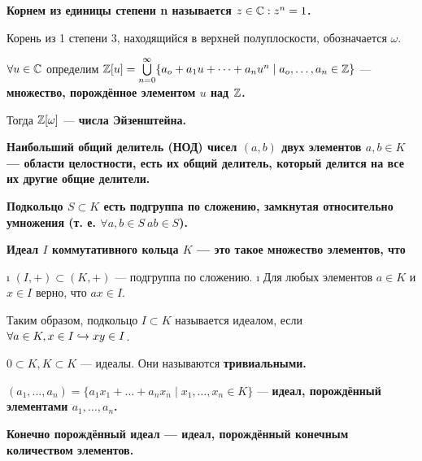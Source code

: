 \begin{defn}
\bf{Корнем из единицы степени n} называется \(z \in \mathbb{C}: z^n=1\).

Корень из 1 степени 3, находящийся в верхней полуплоскости, обозначается \(\omega\).

\(\forall u \in \mathbb{C}\) определим \(\mathbb{Z}[u] = \bigcup\limits_{n=0}^\infty \{a_o+a_1u+\dots+a_nu^n \mid a_o, \dots, a_n \in \mathbb{Z} \}\) --- \bf{множество, порождённое элементом \(u\) над \(\mathbb{Z}\)}.

Тогда \(\mathbb{Z}[\omega]\) --- \bf{числа Эйзенштейна}.
\end{defn}

\begin{defn}
\bf{Наибольший общий делитель (НОД)} чисел \((a, b)\) двух элементов \(a, b \in K\) --- области целостности, есть их общий делитель, который делится на все их другие общие делители.
\end{defn}

\begin{defn}
\bf{Подкольцо} \(S \subset K\) есть подгруппа по сложению, замкнутая относительно умножения (т. е. \(\forall a, b \in S \ ab \in S\)).
\end{defn}

\begin{defn}
\bf{Идеал} \(I\) коммутативного кольца \(K\) --- это такое множество элементов, что

\begin{enumerate}
\def\labelenumi{\arabic{enumi}.}
\tightlist
\i
  \((I,+) \subset (K,+)\) --- подгруппа по сложению.
\i
  Для любых элементов \(a\in K\) и \(x \in I\) верно, что \(ax \in I\).
\end{enumerate}

Таким образом, подкольцо \(I \subset K\) называется идеалом, если \(\forall a\in K, x \in I \hookrightarrow xy \in I\).
\end{defn}

\begin{defn}
\(0 \subset K, K \subset K\) --- идеалы. Они называются \bf{тривиальными}.
\end{defn}

\begin{defn}
\((a_1,\ldots,a_n) = \{a_1x_1+\ldots+a_nx_n \mid x_1,\ldots,x_n \in K\}\) --- \bf{идеал, порождённый элементами \(a_1,\ldots,a_n\)}.
\end{defn}

\begin{defn}
\bf{Конечно порождённый идеал} --- идеал, порождённый конечным количеством элементов.
\end{defn}

